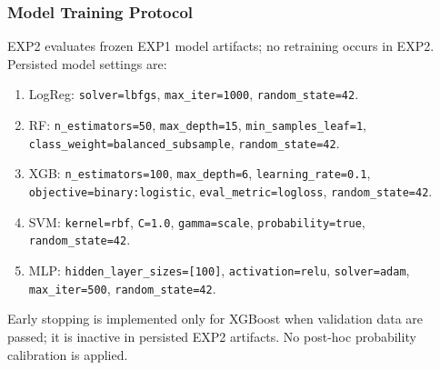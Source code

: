 \documentclass[twoside,11pt]{article}
\begin{document}
\subsubsection{Model Training Protocol}
EXP2 evaluates frozen EXP1 model artifacts; no retraining occurs in EXP2.
Persisted model settings are:
\begin{enumerate}[leftmargin=*]
    \item LogReg: \texttt{solver=lbfgs}, \texttt{max\_iter=1000}, \texttt{random\_state=42}.
    \item RF: \texttt{n\_estimators=50}, \texttt{max\_depth=15}, \texttt{min\_samples\_leaf=1}, \texttt{class\_weight=balanced\_subsample}, \texttt{random\_state=42}.
    \item XGB: \texttt{n\_estimators=100}, \texttt{max\_depth=6}, \texttt{learning\_rate=0.1}, \texttt{objective=binary:logistic}, \texttt{eval\_metric=logloss}, \texttt{random\_state=42}.
    \item SVM: \texttt{kernel=rbf}, \texttt{C=1.0}, \texttt{gamma=scale}, \texttt{probability=true}, \texttt{random\_state=42}.
    \item MLP: \texttt{hidden\_layer\_sizes=[100]}, \texttt{activation=relu}, \texttt{solver=adam}, \texttt{max\_iter=500}, \texttt{random\_state=42}.
\end{enumerate}
Early stopping is implemented only for XGBoost when validation data are passed;
it is inactive in persisted EXP2 artifacts. No post-hoc probability calibration
is applied.
\end{document}
